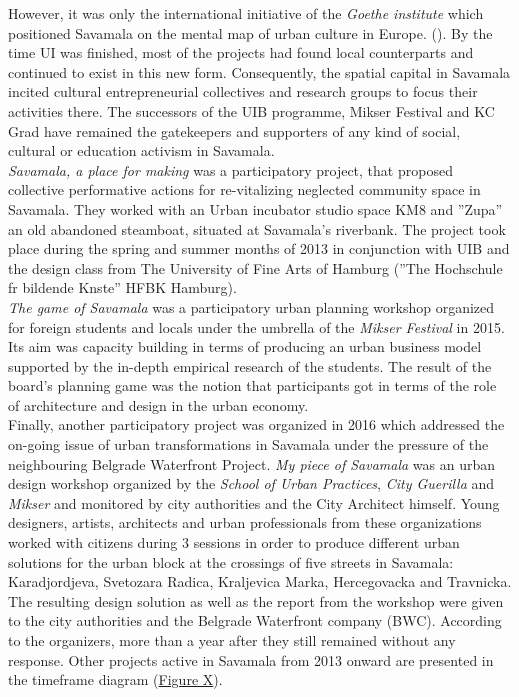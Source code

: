 \documentclass[11pt]{report}
\begin{document}
{{{{However, it was only the international initiative of the \textit{Goethe institute} which positioned Savamala on the mental map of urban culture in Europe. (\href{Kamenzid}{\citealt{kamenzid_urban_2013}}).
By the time UI was finished, most of the projects had found local counterparts and continued to exist in this new form. Consequently, the spatial capital in Savamala incited cultural entrepreneurial collectives and research groups to focus their activities there. The successors of the UIB programme, Mikser Festival and KC Grad have remained the gatekeepers and supporters of any kind of social, cultural or education activism in Savamala.
\\

\textit{Savamala, a place for making} was a participatory project, that proposed collective performative actions for re-vitalizing neglected community space in Savamala.
They worked with an Urban incubator studio space KM8 and ”Zupa” an old abandoned steamboat, situated at Savamala’s riverbank. The project took place during the spring and summer months of 2013 in conjunction with UIB and the design class from The University of Fine Arts of Hamburg (”The Hochschule fr bildende Knste” HFBK Hamburg).
\\

\textit{The game of Savamala} was a participatory urban planning workshop organized for foreign students and locals under the umbrella of the \textit{Mikser Festival} in 2015.
Its aim was capacity building in terms of producing an urban business model supported by the in-depth empirical research of the students. The result of the board’s planning game was the notion that participants got in terms of the role of architecture and design in the urban economy.
\\

Finally, another participatory project was organized in 2016 which addressed the on-going issue of urban transformations in Savamala under the pressure of the neighbouring Belgrade Waterfront Project.
\textit{My piece of Savamala}  was an urban design workshop organized by the \textit{School of Urban Practices}, \textit{City Guerilla} and \textit{Mikser} and monitored by city authorities and the City Architect himself.
Young designers, artists, architects and urban professionals from these organizations worked with citizens during 3 sessions in order to produce different urban solutions for the urban block at the crossings of five streets in Savamala: Karadjordjeva, Svetozara Radica, Kraljevica Marka, Hercegovacka and Travnicka. The resulting design solution as well as the report from the workshop were given to the city authorities and the Belgrade Waterfront company (BWC). According to the organizers, more than a year after they still remained without any response.
Other projects active in Savamala from 2013 onward are presented in the timeframe diagram (\href{FIgure Savamala PUD timeline}{Figure X}).
\\

}}}}
\end{document}
